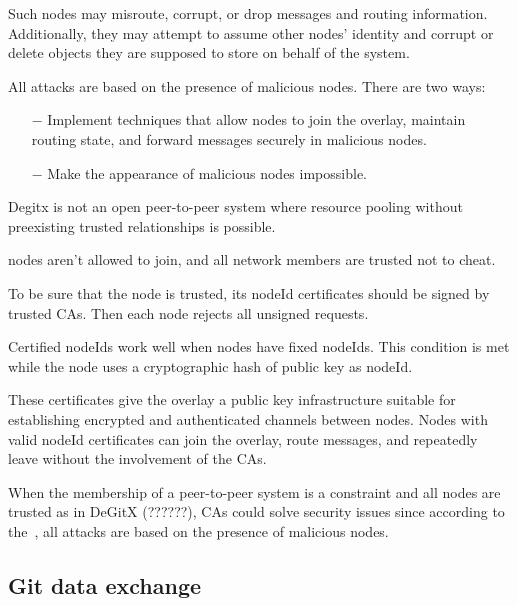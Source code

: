 \documentclass[acmlarge, screen, nonacm, 11pt]{acmart}
\begin{document}
Such nodes may misroute, corrupt, or drop messages and routing information.
Additionally, they may attempt to assume other nodes' identity and corrupt or delete objects
they are supposed to store on behalf of the system.

All attacks are based on the presence of malicious nodes.
There are two ways:
\begin{itemize}
  \item[$-$] Implement techniques that allow nodes to join the overlay,
    maintain routing state, and forward messages securely in malicious nodes.
  \item[$-$] Make the appearance of malicious nodes impossible.
\end{itemize}
Degitx is not an open peer-to-peer system
where resource pooling without preexisting trusted relationships is possible.

nodes aren't allowed to join,
and all network members are trusted not to cheat.

To be sure that the node is trusted, its nodeId certificates should be signed by trusted CAs.
Then each node rejects all unsigned requests.

Certified nodeIds work well when nodes have fixed nodeIds.
This condition is met while the node uses a cryptographic hash of public key as nodeId.

These certificates give the overlay a public key infrastructure
suitable for establishing encrypted and authenticated channels between nodes.
Nodes with valid nodeId certificates can join the overlay, route messages,
and repeatedly leave without the involvement of the CAs.

When the membership of a peer-to-peer system is a constraint and all nodes are trusted as in DeGitX (??????),
CAs could solve security issues since according to the~\cite{Secure_routing_peer-to-peer_overlay_networks}, all attacks are based on the presence of malicious nodes.

\subsection{Git data exchange}\label{sec:data}
\end{document}
